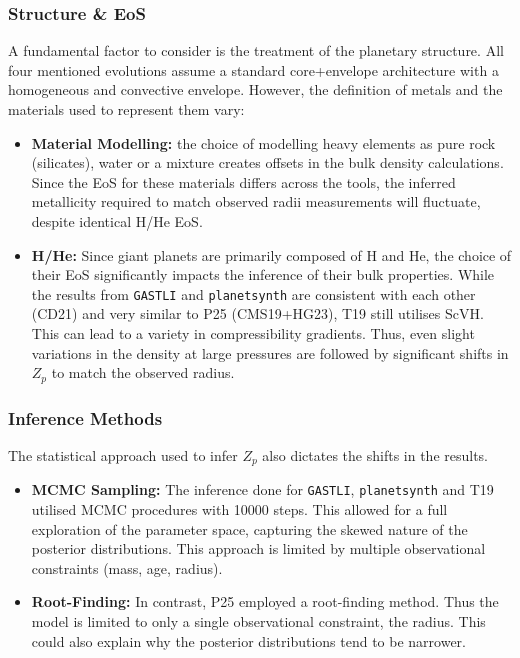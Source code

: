 \documentclass{aa}
\begin{document}
\subsubsection{Structure \& EoS}
A fundamental factor to consider is the treatment of the planetary structure. All four mentioned evolutions assume a standard core+envelope architecture with a homogeneous and convective envelope. However, the definition of metals and the materials used to represent them vary:

\begin{itemize}
    \item{\textbf{Material Modelling:} the choice of modelling heavy elements as pure rock (silicates), water or a mixture creates offsets in the bulk density calculations. Since the EoS for these materials differs across the tools, the inferred metallicity required to match observed radii measurements will fluctuate, despite identical H/He EoS.}
    \item{\textbf{H/He:}} Since giant planets are primarily composed of H and He, the choice of their EoS significantly impacts the inference of their bulk properties. While the results from \texttt{GASTLI} and \texttt{planetsynth} are consistent with each other (CD21) and very similar to P25 (CMS19+HG23), T19 still utilises ScVH. This can lead to a variety in compressibility gradients. Thus, even slight variations in the density at large pressures are followed by significant shifts in $Z_p$ to match the observed radius.
\end{itemize}

\subsubsection{Inference Methods}
The statistical approach used to infer $Z_p$ also dictates the shifts in the results.
\begin{itemize}
    \item{\textbf{MCMC Sampling:} The inference done for \texttt{GASTLI}, \texttt{planetsynth} and T19 utilised MCMC procedures with 10000 steps. This allowed for a full exploration of the parameter space, capturing the skewed nature of the posterior distributions. This approach is limited by multiple observational constraints (mass, age, radius).}
    \item{\textbf{Root-Finding:} In contrast, P25 employed a root-finding method. Thus the model is limited to only a single observational constraint, the radius. This could also explain why the posterior distributions tend to be narrower.}
\end{itemize}
\end{document}
